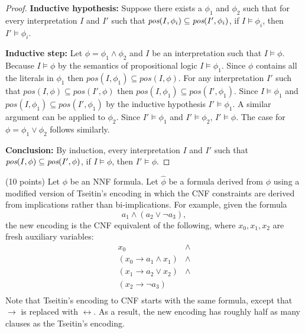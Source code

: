 \documentclass{article}
\newenvironment{solution}{\color{blue} \em }{}
\begin{document}
\begin{enumerate}
\begin{solution}
\begin{proof}
\item \textbf{Inductive hypothesis:} Suppose there exists a $\phi_1$ and $\phi_2$ such that for every interpretation $I$ and $I'$ such that $\emph{pos}(I, \phi_i) \subseteq \emph{pos}(I', \phi_i)$, if $I \models \phi_i$, then $I' \models \phi_i$.

\item \textbf{Inductive step:}
    Let $\phi = \phi_1 \land \phi_2$ and $I$ be an interpretation such that $I \models \phi$. Because $I \models \phi$ by the semantics of propositional logic $I \models \phi_1$. Since $\phi$ contains all the literals in $\phi_1$ then $pos(I, \phi_1) \subseteq pos(I, \phi)$. For any interpretation $I'$ such that $pos(I, \phi) \subseteq pos(I', \phi)$ then $pos(I, \phi_1) \subseteq pos(I', \phi_1)$.  Since $I \models \phi_1$ and $pos(I, \phi_1) \subseteq pos(I', \phi_1)$ by the inductive hypothesis $I' \models \phi_1$. A similar argument can be applied to $\phi_2$. Since $I' \models \phi_1$ and $I' \models \phi_2$, $I' \models \phi$.
The case for $\phi = \phi_1 \lor \phi_2$ follows similarly.

\item \textbf{Conclusion:} By induction, every interpretation $I$ and $I'$ such that $\emph{pos}(I, \phi) \subseteq \emph{pos}(I', \phi)$, if $I \models \phi$, then $I' \models \phi$.
\end{proof}
\end{solution}


\item (10 points) Let $\phi$ be an NNF formula.  Let $\hat{\phi}$ be a formula derived from $\phi$ using a modified version of Tseitin's encoding in which the CNF constraints are derived from implications rather than bi-implications.   For example, given the formula
\[a_1\land (a_2 \lor \neg a_3),\]
the new encoding is the CNF equivalent of the following, where $x_0, x_1, x_2$ are fresh auxiliary variables:
\[
\begin{array}{ll}
x_0 & \land \\
(x_0 \rightarrow a_1 \land x_1) & \land \\
(x_1 \rightarrow a_2 \lor x_2) & \land \\
(x_2 \rightarrow \neg a_3) &  \\
\end{array}
\]
Note that Tseitin's encoding to CNF starts with the same formula, except that $\rightarrow$ is replaced with $\leftrightarrow$.  As a result, the new encoding has roughly half as many clauses as the Tseitin's encoding.


\end{enumerate}
\end{document}
